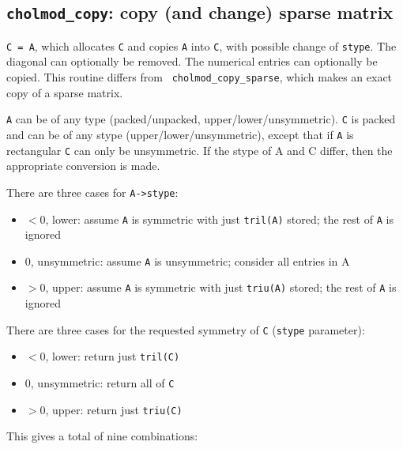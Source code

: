 \documentclass[11pt]{article}
\begin{document}
\subsection{{\tt cholmod\_copy}: copy (and change) sparse matrix}


{\tt C = A}, which allocates {\tt C} and copies {\tt A} into {\tt C}, with
possible change of {\tt stype}.  The diagonal can optionally be removed.  The
numerical entries can optionally be copied.  This routine differs from {\tt
cholmod\_copy\_sparse}, which makes an exact copy of a sparse matrix.

{\tt A} can be of any type (packed/unpacked, upper/lower/unsymmetric).  {\tt C}
is packed and can be of any stype (upper/lower/unsymmetric), except that if
{\tt A} is rectangular {\tt C} can only be unsymmetric.  If the stype of A and
C differ, then the appropriate conversion is made.

\noindent
There are three cases for {\tt A->stype}:
\begin{itemize}
\item $<0$,  lower: assume {\tt A} is symmetric with just {\tt tril(A)} stored;
the rest of {\tt A} is ignored
\item $ 0$,  unsymmetric: assume {\tt A} is unsymmetric; consider all entries
in A
\item $>0$,  upper: assume {\tt A} is symmetric with just {\tt triu(A)} stored;
the rest of {\tt A} is ignored
\end{itemize}

\noindent
There are three cases for the requested symmetry of {\tt C} ({\tt stype}
parameter):
\begin{itemize}
\item $<0$,  lower: return just {\tt tril(C)}
\item $0$,   unsymmetric: return all of {\tt C}
\item $>0$,  upper: return just {\tt triu(C)}
\end{itemize}

\noindent
This gives a total of nine combinations: \newline
\end{document}
